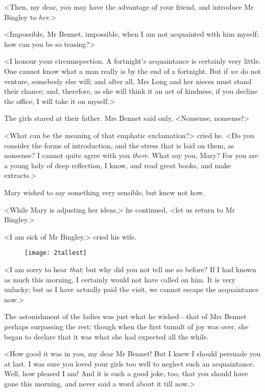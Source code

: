 <Then, my dear, you may have the advantage of your friend, and introduce Mr Bingley to \textit{her}.>

<Impossible, Mr Bennet, impossible, when I am not acquainted with him myself; how can you be so teasing?>

<I honour your circumspection. A fortnight's acquaintance is certainly very little. One cannot know what a man really is by the end of a fortnight. But if \textit{we} do not venture, somebody else will; and after all, Mrs Long and her nieces must stand their chance; and, therefore, as she will think it an act of kindness, if you decline the office, I will take it on myself.>

The girls stared at their father. Mrs Bennet said only, <Nonsense, nonsense!>

<What can be the meaning of that emphatic exclamation?> cried he. <Do you consider the forms of introduction, and the stress that is laid on them, as nonsense? I cannot quite agree with you \textit{there}. What say you, Mary? For you are a young lady of deep reflection, I know, and read great books, and make extracts.>

Mary wished to say something very sensible, but knew not how.

<While Mary is adjusting her ideas,> he continued, <let us return to Mr Bingley.>

<I am sick of Mr Bingley,> cried his wife.

\begin{figure}[tbh!]
\centering
\texttt{[image: 2tallest]}
\end{figure}

<I am sorry to hear \textit{that}; but why did you not tell me so before? If I had known as much this morning, I certainly would not have called on him. It is very unlucky; but as I have actually paid the visit, we cannot escape the acquaintance now.>

The astonishment of the ladies was just what he wished—that of Mrs Bennet perhaps surpassing the rest; though when the first tumult of joy was over, she began to declare that it was what she had expected all the while.

<How good it was in you, my dear Mr Bennet! But I knew I should persuade you at last. I was sure you loved your girls too well to neglect such an acquaintance. Well, how pleased I am! And it is such a good joke, too, that you should have gone this morning, and never said a word about it till now.>

